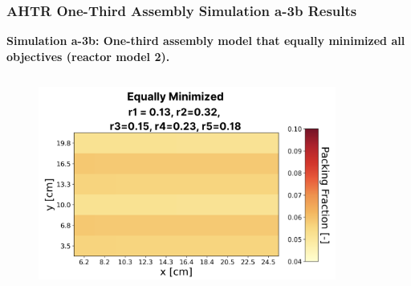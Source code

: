 \begin{frame}
    \frametitle{AHTR One-Third Assembly Simulation a-3b Results}
    \textbf{Simulation a-3b: One-third assembly model that equally minimized all 
    objectives (reactor model 2).}
    \begin{columns}[t]
        \begin{column}{0.4\textwidth}
            \begin{figure}
                \includegraphics[width=\linewidth]{figures/a-3b-equal.png} 
            \end{figure}
        \end{column}
        \begin{column}{0.6\textwidth}
            \begin{figure}
            \end{figure}
        \end{column}
    \end{columns}
\end{frame}

